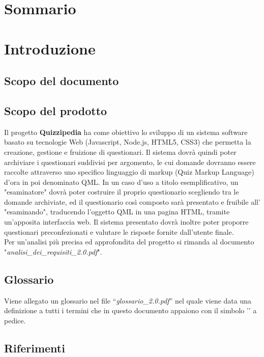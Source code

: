 \documentclass[a4paper,11pt]{article}
\begin{document}
	\newpage
	
	\section*{Sommario}
	
	
	\newpage
	\section{Introduzione}
	\subsection{Scopo del documento}
	
	
	\subsection{Scopo del prodotto}
	Il progetto \textbf{Quizzipedia} ha come obiettivo lo sviluppo di un sistema software basato su tecnologie Web (Javascript\addglos, Node.js\addglos, HTML5\addglos, CSS3\addglos) che permetta la creazione, gestione e fruizione di questionari. Il sistema dovrà quindi poter archiviare i questionari suddivisi per argomento, le cui domande dovranno essere raccolte attraverso uno specifico linguaggio di markup (Quiz Markup Language) d'ora in poi denominato QML\addglos. In un caso d'uso a titolo esemplificativo, un "esaminatore" dovrà poter costruire il proprio questionario scegliendo tra le domande archiviate, ed il questionario così composto sarà presentato e fruibile all' "esaminando", traducendo l'oggetto QML in una pagina HTML\addglos, tramite un'apposita interfaccia web. Il sistema presentato dovrà inoltre poter proporre questionari preconfezionati e valutare le risposte fornite dall'utente finale.
	\\
	Per un'analisi più precisa ed approfondita del progetto si rimanda al documento\\ "\textit{analisi\_dei\_requisiti\_2.0.pdf}".
	\subsection{Glossario}
	Viene allegato un glossario nel file ``\textit{glossario\_2.0.pdf}'' nel quale viene data una definizione a tutti i termini che in questo documento appaiono con il simbolo '\addglos' a pedice.
	\subsection{Riferimenti}
\end{document}
